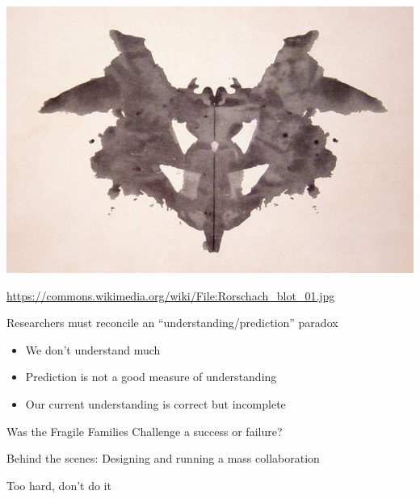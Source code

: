 \documentclass[aspectratio=169]{beamer}
\begin{document}
\begin{frame}

\begin{center}
\includegraphics[height=\textheight]{figures/Rorschach_blot_01.jpg}
\end{center}

\vfill
\tiny{\url{https://commons.wikimedia.org/wiki/File:Rorschach_blot_01.jpg}}

\end{frame}
\begin{frame}

Researchers must reconcile an ``understanding/prediction'' paradox \pause
\begin{itemize}
\item We don't understand much \pause
\item Prediction is not a good measure of understanding \pause
\item Our current understanding is correct but incomplete
\end{itemize}

\end{frame}
\begin{frame}

Was the Fragile Families Challenge a success or failure?

\end{frame}
\begin{frame}

Behind the scenes: Designing and running a mass collaboration

\end{frame}
\begin{frame}

Too hard, don't do it

\end{frame}
\end{document}
